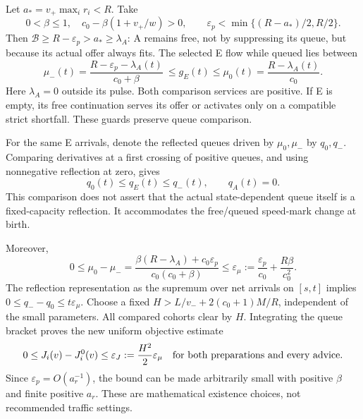 \documentclass[11pt,a4paper]{article}
\newcommand{\Bud}{\mathcal B}
\begin{document}
Let $a_* =v_+\max_i r_i<R$. Take
\begin{equation}
 0<\beta\leq1,\quad c_0-\beta(1+v_+/w)>0,\qquad
 \varepsilon_p<\min\{(R-a_*)/2,R/2\}.
 \label{eq:smallconditions}
\end{equation}
Then $\Bud\geq R-\varepsilon_p>a_*\geq\lambda_A$: A remains free,
not by suppressing its queue, but because its actual offer always fits.
The selected E flow while queued lies between
\begin{equation}
 \mu_-(t)=\frac{R-\varepsilon_p-\lambda_A(t)}{c_0+\beta}
 \ \leq g_E(t)\leq
 \mu_0(t)=\frac{R-\lambda_A(t)}{c_0}.
 \label{eq:servicebracket}
\end{equation}
Here $\lambda_A=0$ outside its pulse. Both comparison services are positive.
If E is empty, its free continuation serves its offer or activates only
on a compatible strict shortfall. These guards preserve queue comparison.

For the same E arrivals, denote the reflected queues driven by
$\mu_0,\mu_-$ by $q_0,q_-$. Comparing derivatives at a first crossing of
positive queues, and using nonnegative reflection at zero, gives
\begin{equation}
 q_0(t)\leq q_E(t)\leq q_-(t),\qquad q_A(t)=0.
 \label{eq:queuebracket}
\end{equation}
This comparison does not assert that the actual state-dependent queue
itself is a fixed-capacity reflection. It accommodates the free/queued
speed-mark change at birth.

Moreover,
\begin{equation}
 0\leq\mu_0-\mu_-
 =\frac{\beta(R-\lambda_A)+c_0\varepsilon_p}{c_0(c_0+\beta)}
 \leq\varepsilon_\mu:=\frac{\varepsilon_p}{c_0}
                           +\frac{R\beta}{c_0^2}.
 \label{eq:servicedifference}
\end{equation}
The reflection representation as the supremum over net arrivals on
$[s,t]$ implies $0\leq q_--q_0\leq t\varepsilon_\mu$.
Choose a fixed $H>L/v_-+2(c_0+1)M/R$, independent of the small
parameters. All compared cohorts clear by $H$. Integrating the queue
bracket proves the new uniform objective estimate
\begin{equation}
 0\leq J_i(v)-J_i^0(v)\leq
 \varepsilon_J:=\frac{H^2}{2}\varepsilon_\mu
 \quad\hbox{for both preparations and every advice.}
 \label{eq:uniformvalue}
\end{equation}
Since $\varepsilon_p=O(a_r^{-1})$, the bound can be made arbitrarily
small with positive $\beta$ and finite positive $a_r$. These are
mathematical existence choices, not recommended traffic settings.
\end{document}

